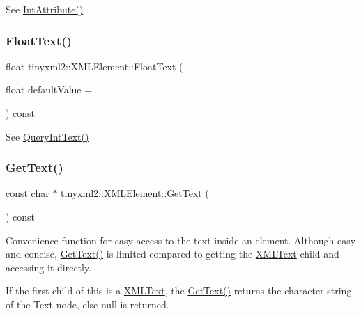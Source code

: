 See \mbox{\hyperlink{classtinyxml2_1_1_x_m_l_element_a95a89b13bb14a2d4655e2b5b406c00d4}{Int\+Attribute()}} 

\mbox{\label{classtinyxml2_1_1_x_m_l_element_a45444eb21f99ca46101545992dc2e927}} 
\subsubsection{\texorpdfstring{Float\+Text()}{FloatText()}}
{\footnotesize\ttfamily float tinyxml2\+::\+X\+M\+L\+Element\+::\+Float\+Text (\begin{DoxyParamCaption}\item[{float}]{default\+Value = {} }\end{DoxyParamCaption}) const}



See \mbox{\hyperlink{classtinyxml2_1_1_x_m_l_element_a926357996bef633cb736e1a558419632}{Query\+Int\+Text()}} 

\mbox{\label{classtinyxml2_1_1_x_m_l_element_a0fa5bea0a4daf3ddd503dcabb823eba6}} 
\subsubsection{\texorpdfstring{Get\+Text()}{GetText()}}
{\footnotesize\ttfamily const char $\ast$ tinyxml2\+::\+X\+M\+L\+Element\+::\+Get\+Text (\begin{DoxyParamCaption}{ }\end{DoxyParamCaption}) const}

Convenience function for easy access to the text inside an element. Although easy and concise, \mbox{\hyperlink{classtinyxml2_1_1_x_m_l_element_a0fa5bea0a4daf3ddd503dcabb823eba6}{Get\+Text()}} is limited compared to getting the \mbox{\hyperlink{classtinyxml2_1_1_x_m_l_text}{X\+M\+L\+Text}} child and accessing it directly.

If the first child of \textquotesingle{}this\textquotesingle{} is a \mbox{\hyperlink{classtinyxml2_1_1_x_m_l_text}{X\+M\+L\+Text}}, the \mbox{\hyperlink{classtinyxml2_1_1_x_m_l_element_a0fa5bea0a4daf3ddd503dcabb823eba6}{Get\+Text()}} returns the character string of the Text node, else null is returned.

